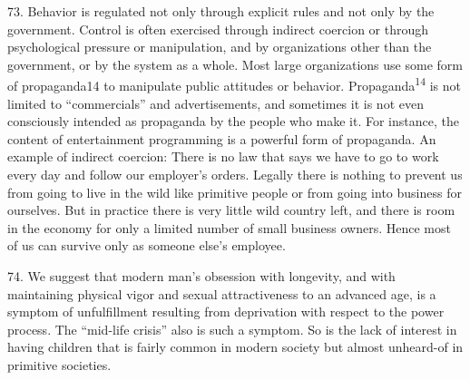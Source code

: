 \documentclass{article}
\begin{document}
73.  Behavior is regulated not only through explicit rules and not only by the government.  Control 
is  often  exercised  through  indirect  coercion  or  through  psychological  pressure  or  manipulation,  
and  by  organizations  other  than  the  government,  or  by  the  system  as  a  whole.   Most  large  
organizations use some form of propaganda14 to manipulate public attitudes or 
behavior.  Propaganda\textsuperscript{14} is not limited to “commercials” and advertisements, and sometimes it is not 
even consciously intended as propaganda by the people who make it.  For instance, the content of 
entertainment programming is a powerful form of propaganda.  An example of indirect coercion: 
There  is  no  law  that  says  we  have  to  go  to  work  every  day  and  follow  our  employer’s  
orders.  Legally there is nothing to prevent us from going to live in the wild like primitive people 
or from going into business for ourselves.  But in practice there is very little wild country left, and 
there is room in the economy for only a limited number of small business owners.  Hence most of 
us can survive only as someone else’s employee. \vspace{\baselineskip}

74.  We suggest that modern man’s obsession with longevity, and with maintaining physical vigor 
and  sexual  attractiveness  to  an  advanced  age,  is  a  symptom  of  unfulfillment  resulting  from  
deprivation with respect to the power process.  The “mid-life crisis” also is such a symptom.  So 
is  the  lack  of  interest  in  having  children  that  is  fairly  common  in  modern  society  but  almost  
unheard-of in primitive societies. \vspace{\baselineskip}
\end{document}
